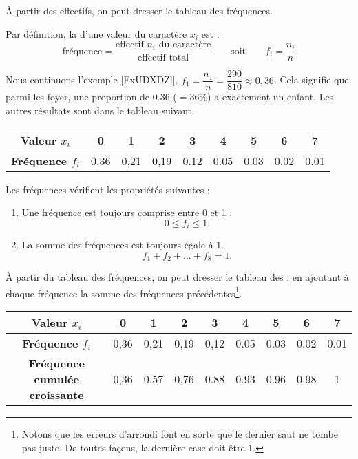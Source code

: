 À partir des effectifs, on peut dresser le tableau des fréquences.

Par définition, la  d'une valeur du caractère $x_i$ est :
\[
\mbox{fréquence} 
= \frac{\mbox{effectif $n_i$ du caractère}}{\mbox{effectif total}}
\qquad
\mbox{soit} 
\qquad
f_i = \dfrac{n_i}{n}
\]

\begin{example}
Nous continuons l'exemple \ref{ExUDXDZl}, $f_1 = \dfrac{n_1}{n} = \dfrac{290}{810} \approx 0,36$. Cela signifie que parmi les foyer, une proportion de \( 0.36\) (\( =36\%\)) a exactement un enfant. Les autres résultats sont dans le tableau suivant.

\begin{center}
\begin{tabular}[t]{|c|c|c|c|c|c|c|c|c|}
    \hline
  \textbf{Valeur $x_i$} & 0 & 1 & 2 & 3 & 4 & 5 & 6 & 7 \\
  \hline
  \textbf{Fréquence $f_i$} & 0,36 & 0,21 & 0,19 & 0.12  & 0.05 & 0.03 & 0.02 & 0.01 \\ 
  \hline
\end{tabular}
    
\end{center}
    
\end{example}


Les fréquences vérifient les propriétés suivantes :
\begin{enumerate}
  \item Une fréquence est toujours comprise entre 0 et 1 :
      \begin{equation}
    0\leq f_i\leq 1.
      \end{equation}
  \item La somme des fréquences est toujours égale à 1.  
      \begin{equation}
      f_1+f_2+{\ldots}+f_8 =  1.
      \end{equation}
\end{enumerate}

\bigskip

À partir du tableau des fréquences, on peut dresser le tableau des , en ajoutant à chaque fréquence la somme des fréquences précédentes\footnote{Notons que les erreurs d'arrondi font en sorte que le dernier saut ne tombe pas juste. De toutes façons, la dernière case doit être \( 1\).}.

\begin{center}
\begin{tabular}[h]{|c|c|c|c|c|c|c|c|c|}
    \hline
  \textbf{Valeur $x_i$} & 0 & 1 & 2 & 3 & 4 & 5 & 6 & 7 \\
  \hline
  \textbf{Fréquence $f_i$} & 0,36 & 0,21 & 0,19 & 0,12 & 0.05  & 0.03 & 0.02 & 0.01 \\ 
  \hline
  \textbf{Fréquence cumulée croissante} & 0,36 & 0,57 & 0,76 & 0.88 & 0.93 & 0.96 & 0.98  & 1 \\ 
  \hline
\end{tabular}
\end{center}

